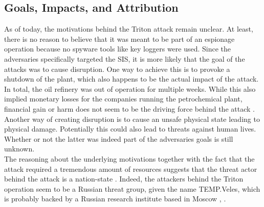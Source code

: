 \documentclass[runningheads]{llncs}
\begin{document}
\subsection{Goals, Impacts, and Attribution}
As of today, the motivations behind the Triton attack remain unclear.
At least, there is no reason to believe that it was meant to be part of an espionage operation because no spyware tools like key loggers were used. %
Since the adversaries specifically targeted the SIS, it is more likely that the goal of the attacks was to cause disruption.
One way to achieve this is to provoke a shutdown of the plant, which also happens to be the actual impact of the attack.
In total, the oil refinery was out of operation for multiple weeks. %
While this also implied monetary losses for the companies running the petrochemical plant, financial gain or harm does not seem to be the driving force behind the attack \cite{kovacs.17}.
Another way of creating disruption is to cause an unsafe physical state leading to physical damage. \cite{dragos.17}
Potentially this could also lead to threats against human lives.
Whether or not the latter was indeed part of the adversaries goals is still unknown.\\
The reasoning about the underlying motivations together with the fact that the attack required a tremendous amount of resources suggests that the threat actor behind the attack is a nation-state \cite{kovacs.17}.
Indeed, the attackers behind the Triton operation seem to be a Russian threat group, given the name TEMP.Veles, which is probably backed by a Russian research institute based in Moscow \cite{fireeye.18}, \cite{sobczak.19}.
\end{document}
